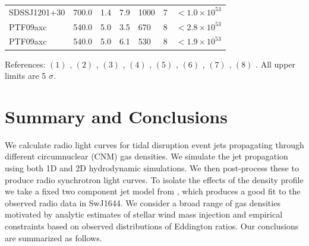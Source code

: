 \documentclass[usenatbib,fleqn]{mnras}
\begin{document}
\begin{table}
\begin{threeparttable}
\begin{tabular*}{1.5\columnwidth}{lllllll}
SDSSJ1201+30 & 700.0 & 1.4 & 7.9 & 1000 & 7 & $< 1.0 \times 10^{ 53 }$ \\
PTF09axc & 540.0 & 5.0 & 3.5 & 670 & 8 & $< 2.8 \times 10^{ 53 }$ \\
PTF09axc & 540.0 & 5.0 & 6.1 & 530 & 8 & $< 1.9 \times 10^{ 53 }$ \\
\end{tabular*}
\begin{tablenotes}
\item References: $(1)$ \citet{Bower+2013}, $(2)$ \citet{van-Velzen+2013},
$(3)$ \citet{Bade+1996, Komossa2002},
$(4)$ \citet{Gezari+2008,Bower+2011}, $(5)$ \citet{van-Velzen+2011},
$(6)$ \citet{Drake+2011}, $(7)$ \citet{Saxton+2012}, $(8)$
\citet{Arcavi+2014}. All upper limits are 5 $\sigma$.
\end{tablenotes}
\end{threeparttable}
\end{table}

\section{Summary and Conclusions}
\label{sec:conc}

We calculate radio light curves for tidal disruption event jets
propagating through different circumnuclear (CNM) gas densities. We
simulate the jet propagation using both 1D and 2D hydrodynamic
simulations. We then post-process these to produce radio synchrotron
light curves. To isolate the effects of the density profile we take a
fixed two component jet model from \citet{Mimica+2015}, which produces
a good fit to the observed radio data in SwJ1644. We
consider a broad range of gas densities motivated by analytic
estimates of stellar wind mass injection and empirical constraints
based on observed distributions of Eddington ratios. Our conclusions
are summarized as follows.
\end{document}
